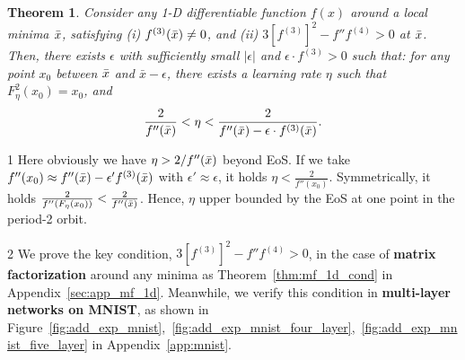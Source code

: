 \documentclass{article}
\theoremstyle{plain}
\newtheorem{theorem}{Theorem}
\theoremstyle{remark}
\newenvironment{sketch}{\paragraph{Proof sketch}}{\hfill$\square$}
\newcommand{\T}[1]{^{(#1)}}
\def\O{\mathcal{O}}
\newcommand{\fix}[1]{\noindent{\color{blue}{#1}}}
\begin{document}
\begin{theorem}
Consider any 1-D differentiable function $f(x)$ around a local minima $\Bar{x}$, satisfying (i) $f^{(3)}(\Bar{x})\neq 0$, and (ii) $3[f\T{3}]^2-f'' f\T{4}>0$ at $\Bar{x}$. Then, there exists $\epsilon$ with sufficiently small $|\epsilon|$ and $\epsilon\cdot f^{(3)}>0$ such that: for any point $x_0$ between $\Bar{x}$ and $\bar{x} - \epsilon$, there exists a learning rate $\eta$ such that $F^2_\eta(x_0)=x_0$, and
\[
\frac{2}{f''(\Bar{x})}<\eta<\frac{2}{f''(\Bar{x})-\epsilon\cdot f^{(3)}(\Bar{x})}.
\]
\label{thm:1dlocal}
\end{theorem}

\begin{customremark}{1}
    Here obviously we have $\eta>2/f''(\Bar{x})$ beyond EoS. If we take $f''(x_0)\approx f''(\Bar{x}) - \epsilon' f^{(3)}(\Bar{x})$ with $\epsilon'\approx \epsilon$, it holds $\eta<\frac{2}{f''(x_0)}$. Symmetrically, it holds $\frac{2}{f''(F_\eta(x_0))}<\frac{2}{f''(\Bar{x})}$. Hence, $\eta$ upper bounded by the EoS at one point in the period-2 orbit. 
\end{customremark}
\begin{customremark}{2}
    We prove the key condition, $3[f\T{3}]^2-f'' f\T{4}>0$, in the case of \textbf{matrix factorization} around any minima as Theorem~\ref{thm:mf_1d_cond} in Appendix~\ref{sec:app_mf_1d}. Meanwhile, we verify this condition in \textbf{multi-layer networks on MNIST}, as shown in Figure~\ref{fig:add_exp_mnist},~\ref{fig:add_exp_mnist_four_layer},~\ref{fig:add_exp_mnist_five_layer} in Appendix~\ref{app:mnist}.
\end{customremark}
\end{document}
